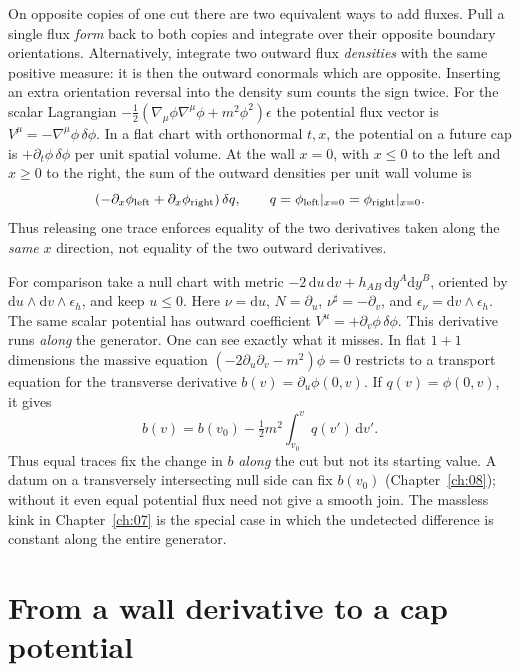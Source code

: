 On opposite copies of one cut there are two equivalent ways to add fluxes. Pull a single flux \emph{form} back to both copies and integrate over their opposite boundary orientations. Alternatively, integrate two outward flux \emph{densities} with the same positive measure: it is then the outward conormals which are opposite. Inserting an extra orientation reversal into the density sum counts the sign twice. For the scalar Lagrangian $-\tfrac12(\nabla_\mu\phi\nabla^\mu\phi+m^2\phi^2)\epsilon$ the potential flux vector is $V^\mu=-\nabla^\mu\phi\,\delta\phi$. In a flat chart with orthonormal $t,x$, the potential on a future cap is $+\partial_t\phi\,\delta\phi$ per unit spatial volume. At the wall $x=0$, with $x\leq0$ to the left and $x\geq0$ to the right, the sum of the outward densities per unit wall volume is
\[
 (-\partial_x\phi_{\rm left}+\partial_x\phi_{\rm right})\,\delta q,
 \qquad q=\phi_{\rm left}|_{x=0}=\phi_{\rm right}|_{x=0} .
\]
Thus releasing one trace enforces equality of the two derivatives taken along the \emph{same} $x$ direction, not equality of the two outward derivatives.

For comparison take a null chart with metric $-2\,\mathrm{d}u\,\mathrm{d}v+h_{AB}\,\mathrm{d}y^A\mathrm{d}y^B$, oriented by $\mathrm{d}u\wedge\mathrm{d}v\wedge\epsilon_h$, and keep $u\leq0$. Here $\nu=\mathrm{d}u$, $N=\partial_u$, $\nu^\sharp=-\partial_v$, and $\epsilon_\nu=\mathrm{d}v\wedge\epsilon_h$. The same scalar potential has outward coefficient $V^u=+\partial_v\phi\,\delta\phi$. This derivative runs \emph{along} the generator. One can see exactly what it misses. In flat $1+1$ dimensions the massive equation $(-2\partial_u\partial_v-m^2)\phi=0$ restricts to a transport equation for the transverse derivative $b(v)=\partial_u\phi(0,v)$. If $q(v)=\phi(0,v)$, it gives
\[
 b(v)=b(v_0)-\tfrac12 m^2\int_{v_0}^{v}q(v')\,\mathrm{d}v' .
\]
Thus equal traces fix the change in $b$ \emph{along} the cut but not its starting value. A datum on a transversely intersecting null side can fix $b(v_0)$ (Chapter~\ref{ch:08}); without it even equal potential flux need not give a smooth join. The massless kink in Chapter~\ref{ch:07} is the special case in which the undetected difference is constant along the entire generator.

\section{From a wall derivative to a cap potential}

